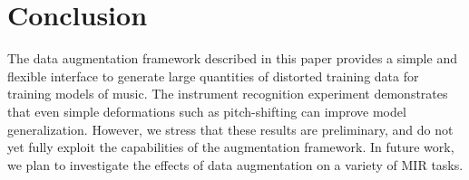 \documentclass{article}
\begin{document}
\section{Conclusion}

The data augmentation framework described in this paper provides a simple and flexible
interface to generate large quantities of distorted training data for training models of
music.  The instrument recognition experiment demonstrates that even simple deformations
such as pitch-shifting can improve model generalization.  However, we stress that these
results are preliminary, and do not yet fully exploit the capabilities of the
augmentation framework.  In future work, we plan to investigate the effects of
data augmentation on a variety of MIR tasks.




\end{document}
